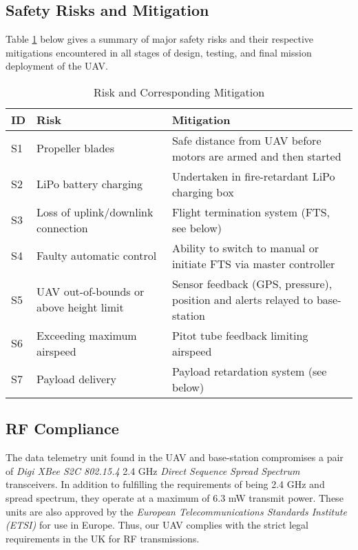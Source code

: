 \subsection{Safety Risks and Mitigation}
Table \ref{tab:risks} below gives a summary of major safety risks and their respective mitigations encountered in all stages of design, testing, and final mission deployment of the UAV.

\begin{table}[h]
\begin{tabularx}{\textwidth}{ p{} | p{} | X } 
\textbf{ID} & \textbf{Risk} & \textbf{Mitigation} \\ \hline
S1 & Propeller blades & Safe distance from UAV before motors are armed and then started \\ \hline
S2 & LiPo battery charging & Undertaken in fire-retardant LiPo charging box \\ \hline
S3 & Loss of uplink/downlink connection & Flight termination system (FTS, see below) \\ \hline
S4 & Faulty automatic control & Ability to switch to manual or initiate FTS via master controller \\ \hline
S5 & UAV out-of-bounds or above height limit & Sensor feedback (GPS, pressure), position and alerts relayed to base-station \\ \hline
S6 & Exceeding maximum airspeed & Pitot tube feedback limiting airspeed \\ \hline
S7 & Payload delivery & Payload retardation system (see below) \\
\end{tabularx}
\caption{Risk and Corresponding Mitigation}
\label{tab:risks}
\end{table}

\subsection{RF Compliance}
The data telemetry unit found in the UAV and base-station compromises a pair of \textit{Digi XBee S2C 802.15.4} 2.4 GHz \textit{Direct Sequence Spread Spectrum} transceivers. In addition to fulfilling the requirements of being 2.4 GHz and spread spectrum, they operate at a maximum of 6.3 mW transmit power. These units are also approved by the \textit{European Telecommunications Standards Institute (ETSI)} for use in Europe. Thus, our UAV complies with the strict legal requirements in the UK for RF transmissions.

